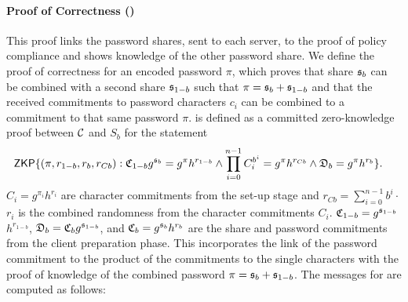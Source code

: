 \paragraph{Proof of Correctness (\PoC)}
This proof links the password shares, sent to each server, to the proof of policy compliance and shows knowledge of the other password share.
We define the proof of correctness for an encoded password $\pi$, which proves that share $\mathfrak{s}_{b}$ can be combined with a second share $\mathfrak{s}_{1-b}$ such that $\pi=\mathfrak{s}_{b}+\mathfrak{s}_{1-b}$ and that the received commitments to password characters $c_i$ can be combined to a commitment to that same password $\pi$.
\PoC is defined as a committed zero-knowledge proof between $\mathcal{C}$ and $S_b$ for the statement
\begin{align*}
&\mathsf{ZKP}\{(\pi,r_{1-b},r_b,r_{Cb}): \mathfrak{C}_{1-b}g^{\mathfrak{s}_{b}}=g^{\pi}h^{r_{1-b}}  \wedge  \prod_{i=0}^{n-1}C_i^{b^i}=g^{\pi}h^{r_{Cb}}  \wedge  \mathfrak{D}_{b}=g^{\pi}h^{r_{b}}\}. 
\end{align*}
$C_i=g^{\pi_i}h^{r_i}$ are character commitments from the set-up stage and $r_{Cb}=\sum_{i=0}^{n-1}b^i\cdot$ $r_i$ is the combined randomness from the character commitments $C_i$.
$\mathfrak{C}_{1-b}=g^{\mathfrak{s}_{1-b}}$ $h^{r_{1-b}}$, $\mathfrak{D}_{b}=\mathfrak{C}_{b}g^{\mathfrak{s}_{1-b}}$, and $\mathfrak{C}_{b}=g^{\mathfrak{s}_{b}}h^{r_{b}}$ are the share and password commitments from the client preparation phase.
This incorporates the link of the password commitment to the product of the commitments to the single characters with the proof of knowledge of the combined password $\pi=\mathfrak{s}_b+\mathfrak{s}_{1-b}$.
The messages for \PoC are computed as follows:

